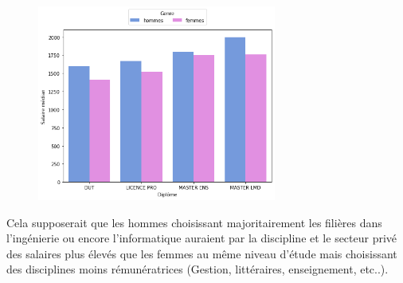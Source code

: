 \documentclass[12pt, a4paper, titlepage, table]{article}
\begin{document}
	\begin{figure}[H]
		\centering
		\includegraphics[width=0.7\textwidth]{../graphs/salaires_medians_genre.png}
		\label{fig:salaire_median_genre}
	\end{figure}
	Cela supposerait que les hommes choisissant majoritairement les filières dans l’ingénierie ou encore l'informatique auraient par la discipline et le secteur privé des salaires plus élevés que les femmes au même niveau d'étude mais choisissant des disciplines moins rémunératrices (Gestion, littéraires, enseignement, etc..).
	
\end{document}
